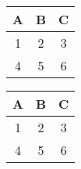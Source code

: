 \documentclass[12pt,twoside,a4paper]{article}
\begin{document}
 
\begin{tabular}{|c|c|c|} 
\hline 
A & B & C \\ 
\hline 
1 & 2 & 3 \\ 
\hline 
4 & 5 & 6 
\\ 
\hline 
\end{tabular} 
\begin{tabular}{|c|c|c|} 
\hline 
A & B & C \\ 
\hline 
1 & 2 & 3 \\ 
\hline 
4 & 5 & 6 
\\ 
\hline 
\end{tabular} 
\end{document}
